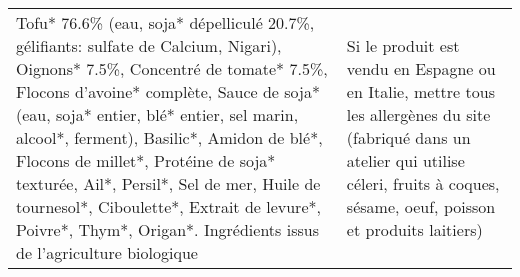 \begin{tabular}{p{7cm}p{7cm}}
 Tofu* 76.6\% (eau, soja* dépelliculé 20.7\%, gélifiants: sulfate de Calcium, Nigari), Oignons* 7.5\%, Concentré de tomate* 7.5\%, Flocons d'avoine* complète, Sauce de soja* (eau, soja* entier, blé* entier, sel marin, alcool*, ferment), Basilic*, Amidon de blé*, Flocons de millet*, Protéine de soja* texturée, Ail*, Persil*, Sel de mer, Huile de tournesol*, Ciboulette*, Extrait de levure*, Poivre*, Thym*, Origan*. \newline * Ingrédients issus de l'agriculture biologique &                                                                                                                                                                                                                                                                                                                                                                                                                                                                                                                                                                                                                                                                                                                                                                                                                                                                                                                                                                                                                                                                                                                                                                                                                                       Si le produit est vendu en Espagne ou en Italie, mettre tous les allergènes du site (fabriqué dans un atelier qui utilise céleri, fruits à coques,  \newline sésame, oeuf, poisson et produits laitiers) \\

\end{tabular}
